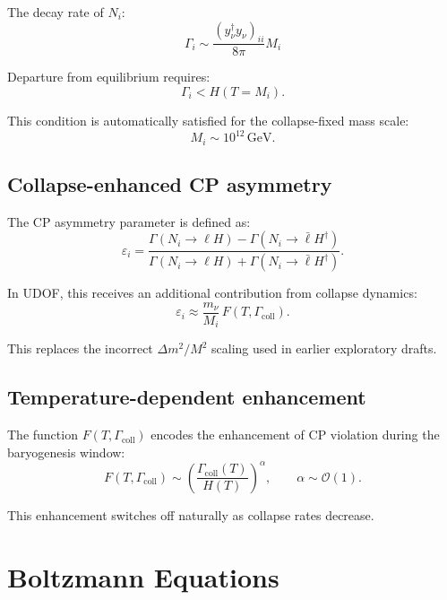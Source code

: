 \documentclass[11pt]{book}
\begin{document}
The decay rate of $N_i$:
\begin{equation}
\Gamma_i \sim \frac{(y_\nu^\dagger y_\nu)_{ii}}{8\pi} M_i
\end{equation}

Departure from equilibrium requires:
\begin{equation}
\Gamma_i < H(T=M_i).
\end{equation}

This condition is automatically satisfied for the collapse-fixed mass
scale:
\begin{equation}
M_i \sim 10^{12}\,\mathrm{GeV}.
\end{equation}

\section{Collapse-enhanced CP asymmetry}

The CP asymmetry parameter is defined as:
\begin{equation}
\varepsilon_i
=
\frac{\Gamma(N_i \to \ell H) - \Gamma(N_i \to \bar{\ell} H^\dagger)}
{\Gamma(N_i \to \ell H) + \Gamma(N_i \to \bar{\ell} H^\dagger)}.
\end{equation}

In UDOF, this receives an additional contribution from collapse dynamics:
\begin{equation}
\varepsilon_i
\approx
\frac{m_\nu}{M_i}
\,F\!\left(T,\Gamma_{\mathrm{coll}}\right).
\end{equation}

This replaces the incorrect
$\Delta m^2 / M^2$ scaling used in earlier exploratory drafts.

\section{Temperature-dependent enhancement}

The function $F(T,\Gamma_{\mathrm{coll}})$ encodes the enhancement of CP
violation during the baryogenesis window:
\begin{equation}
F(T,\Gamma_{\mathrm{coll}})
\sim
\left(\frac{\Gamma_{\mathrm{coll}}(T)}{H(T)}\right)^\alpha,
\qquad
\alpha \sim \mathcal{O}(1).
\end{equation}

This enhancement switches off naturally as collapse rates decrease.

\chapter{Boltzmann Equations}
\end{document}
